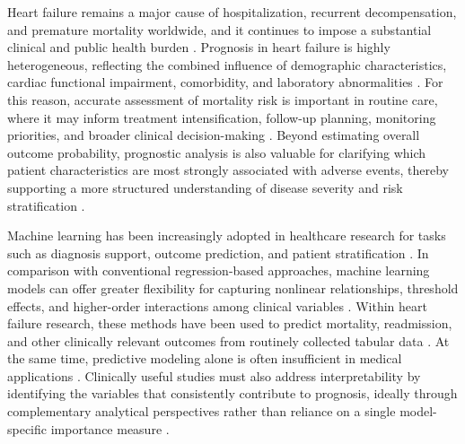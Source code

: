 Heart failure remains a major cause of hospitalization, recurrent decompensation, and premature mortality worldwide, and it continues to impose a substantial clinical and public health burden \cite{khan2024global,bozkurt2025hfstats}. Prognosis in heart failure is highly heterogeneous, reflecting the combined influence of demographic characteristics, cardiac functional impairment, comorbidity, and laboratory abnormalities \cite{bozkurt2021universal,heidenreich2022guideline}. For this reason, accurate assessment of mortality risk is important in routine care, where it may inform treatment intensification, follow-up planning, monitoring priorities, and broader clinical decision-making \cite{heidenreich2022guideline,bozkurt2021universal}. Beyond estimating overall outcome probability, prognostic analysis is also valuable for clarifying which patient characteristics are most strongly associated with adverse events, thereby supporting a more structured understanding of disease severity and risk stratification \cite{khan2024global,bozkurt2025hfstats}.

Machine learning has been increasingly adopted in healthcare research for tasks such as diagnosis support, outcome prediction, and patient stratification \cite{alhejaily2024ai}. In comparison with conventional regression-based approaches, machine learning models can offer greater flexibility for capturing nonlinear relationships, threshold effects, and higher-order interactions among clinical variables \cite{saqib2024hfml,kokori2025survival}. Within heart failure research, these methods have been used to predict mortality, readmission, and other clinically relevant outcomes from routinely collected tabular data \cite{saqib2024hfml,kokori2025survival,liu2024hfhtn,ketabi2024mortality,chicco2020survival}. At the same time, predictive modeling alone is often insufficient in medical applications \cite{collins2024tripodai,moons2025probastai}. Clinically useful studies must also address interpretability by identifying the variables that consistently contribute to prognosis, ideally through complementary analytical perspectives rather than reliance on a single model-specific importance measure \cite{kundu2021explainable,caterson2024xai}.

